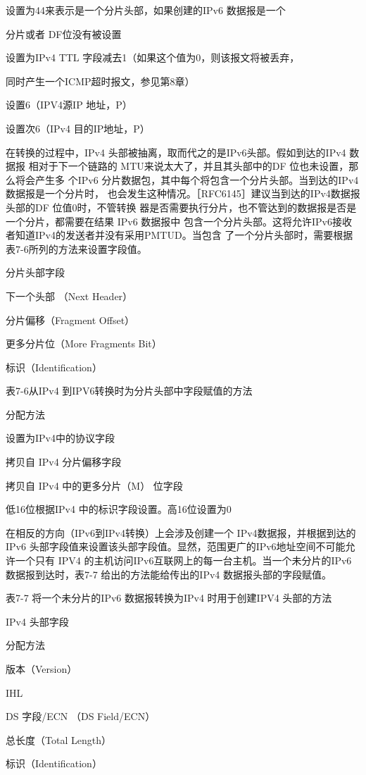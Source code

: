 设置为44来表示是一个分片头部，如果创建的IPv6 数据报是一个

分片或者 DF位没有被设置

设置为IPv4 TTL 字段减去1（如果这个值为0，则该报文将被丢弃，

同时产生一个ICMP超时报文，参见第8章）

设置6（IPV4源IP 地址，P）

设置次6（IPv4 目的IP地址，P）

在转换的过程中，IPv4 头部被抽离，取而代之的是IPv6头部。假如到达的IPv4 数据报
相对于下一个链路的 MTU来说太大了，并且其头部中的DF 位也未设置，那么将会产生多
个IPv6 分片数据包，其中每个将包含一个分片头部。当到达的IPv4数据报是一个分片时，
也会发生这种情况。［RFC6145］建议当到达的IPv4数据报头部的DF 位值0时，不管转换
器是否需要执行分片，也不管达到的数据报是否是一个分片，都需要在结果 IPv6 数据报中
包含一个分片头部。这将允许IPv6接收者知道IPv4的发送者并没有采用PMTUD。当包含
了一个分片头部时，需要根据表7-6所列的方法来设置字段值。

分片头部字段

下一个头部 （Next Header）

分片偏移（Fragment Offset）

更多分片位（More Fragments Bit）

标识（Identification）

表7-6从IPv4 到IPV6转换时为分片头部中字段赋值的方法

分配方法

设置为IPv4中的协议字段

拷贝自 IPv4 分片偏移字段

拷贝自 IPv4 中的更多分片（M） 位字段

低16位根据IPv4 中的标识字段设置。高16位设置为0

在相反的方向（IPv6到IPv4转换）上会涉及创建一个 IPv4数据报，并根据到达的IPv6
头部字段值来设置该头部字段值。显然，范围更广的IPv6地址空间不可能允许一个只有
IPV4 的主机访问IPv6互联网上的每一台主机。当一个未分片的IPv6 数据报到达时，表7-7
给出的方法能给传出的IPv4 数据报头部的字段赋值。

表7-7 将一个未分片的IPv6 数据报转换为IPv4 时用于创建IPV4 头部的方法

IPv4 头部字段

分配方法

版本（Version）

IHL

DS 字段/ECN （DS Field/ECN）

总长度（Total Length）

标识（Identification）

